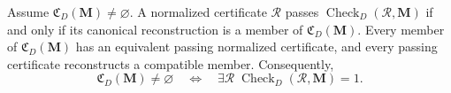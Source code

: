 Assume \(\mathfrak C_D(\mathbf M)\ne\varnothing\).  A normalized certificate \(\mathcal R\) passes \(\operatorname{Check}_{D}(\mathcal R,\mathbf M)\) if and only if its canonical reconstruction is a member of \(\mathfrak C_D(\mathbf M)\).  Every member of \(\mathfrak C_D(\mathbf M)\) has an equivalent passing normalized certificate, and every passing certificate reconstructs a compatible member.  Consequently,
\[
\mathfrak C_D(\mathbf M)\ne\varnothing
\quad\Longleftrightarrow\quad
\exists\mathcal R\;\operatorname{Check}_{D}(\mathcal R,\mathbf M)=1.
\]
